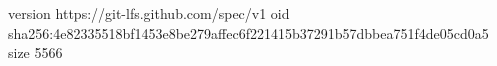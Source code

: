 version https://git-lfs.github.com/spec/v1
oid sha256:4e82335518bf1453e8be279affec6f221415b37291b57dbbea751f4de05cd0a5
size 5566
